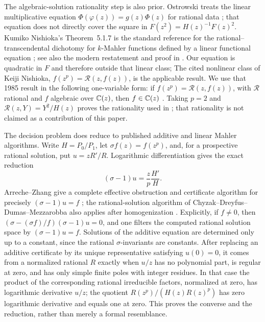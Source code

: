 The algebraic-solution rationality step is also prior.  Ostrowski treats the
linear multiplicative equation
\(\Phi(\varphi(z))=g(z)\Phi(z)\) for rational data
\cite{Ostrowski1968AlgebraicSolutions}; that equation does not directly cover
the square in \(F(z^2)=H(z)^{-1}F(z)^2\).  Kumiko Nishioka's
Theorem~5.1.7 is the standard reference for the rational--transcendental
dichotomy for \(k\)-Mahler functions defined by a linear functional equation
\cite[Theorem~5.1.7]{Nishioka1996MahlerFunctions}; see also the modern
restatement and proof in \cite[Corollary~8]{BellCoonsRowland2013MahlerDichotomy}.
Our equation is quadratic in \(F\) and therefore outside that linear class;
The cited nonlinear class of Keiji Nishioka,
\(f(z^p)=\mathscr R(z,f(z))\), is the applicable result.  We use that 1985
result in the following one-variable form: if
\(f(z^p)=\mathscr R(z,f(z))\), with \(\mathscr R\) rational and \(f\)
algebraic over \(\mathbb{C}(z)\), then \(f\in\mathbb{C}(z)\)
\cite{Nishioka1985AlgebraicSolutions}.  Taking
\(p=2\) and \(\mathscr R(z,Y)=Y^2/H(z)\) proves the rationality used in
; that rationality is not claimed as a
contribution of this paper.

The decision problem does reduce to published additive and linear Mahler
algorithms.  Write \(H=P_0/P_1\), let \(\sigma f(z)=f(z^p)\), and, for a
prospective rational solution, put \(u=zR'/R\).  Logarithmic differentiation
gives the exact reduction
\begin{equation}\label{eq:intro-logarithmic-derivative-reduction}
 (\sigma-1)u=\frac{z}{p}\frac{H'}H.
\end{equation}
Arreche--Zhang give a complete effective obstruction and certificate
algorithm for precisely \((\sigma-1)u=f\)
\cite{ArrecheZhang2022MahlerResidues}; the rational-solution algorithm of
Chyzak--Dreyfus--Dumas--Mezzarobba also applies after homogenization
\cite{ChyzakDreyfusDumasMezzarobba2018MahlerSolutions}.  Explicitly, if
\(f\ne0\), then
\((\sigma-(\sigma f)/f)(\sigma-1)u=0\), and one filters the computed rational
solution space by \((\sigma-1)u=f\).  Solutions of the additive equation are
determined only up to a constant, since the rational \(\sigma\)-invariants are
constants.  After replacing an additive certificate by its unique
representative satisfying \(u(0)=0\), it comes from a normalized rational
\(R\) exactly when \(u/z\) has no polynomial part, is regular at zero, and
has only simple finite poles with integer residues.  In that case the
product of the corresponding rational irreducible factors, normalized at
zero, has logarithmic derivative \(u/z\); the quotient
\(R(z^p)/(H(z)R(z)^p)\) has zero logarithmic derivative and equals one at
zero.  This proves the converse and the reduction, rather than merely a
formal resemblance.

